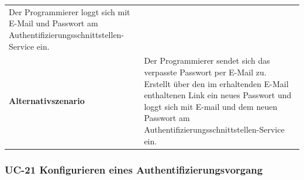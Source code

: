 \begin{longtable}[c]{@{}ll@{}}
\begin{minipage}[t]{0.60\columnwidth}\raggedright\strut
Der Programmierer loggt sich mit E-Mail und Passwort am
Authentifizierungsschnittstellen-Service ein.
\strut\end{minipage}\tabularnewline
\begin{minipage}[t]{0.34\columnwidth}\raggedright\strut
\textbf{Alternativszenario}
\strut\end{minipage} &
\begin{minipage}[t]{0.60\columnwidth}\raggedright\strut
Der Programmierer sendet sich das verpasste Passwort per E-Mail zu.
Erstellt über den im erhaltenden E-Mail enthaltenen Link ein neues
Passwort und loggt sich mit E-mail und dem neuen Passwort am
Authentifizierungsschnittstellen-Service ein.
\strut\end{minipage}\tabularnewline
\bottomrule
\end{longtable}

\subsubsection{UC-21 Konfigurieren eines
Authentifizierungsvorgang}\label{uc-21-konfigurieren-eines-authentifizierungsvorgang}

